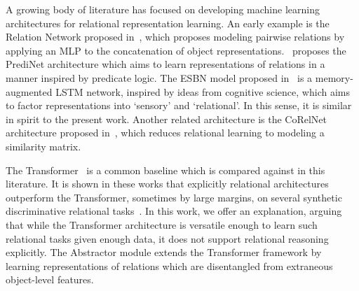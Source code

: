 
% 

A growing body of literature has focused on developing machine learning architectures for relational representation learning. An early example is the Relation Network proposed in~\citep{santoro1}, which proposes modeling pairwise relations by applying an MLP to the concatenation of object representations.~\citep{shanahanExplicitlyRelationalNeural} proposes the PrediNet architecture which aims to learn representations of relations in a manner inspired by predicate logic. The ESBN model proposed in~\citep{esbn} is a memory-augmented LSTM network, inspired by ideas from cognitive science, which aims to factor representations into `sensory' and `relational'. In this sense, it is similar in spirit to the present work. Another related architecture is the CoRelNet architecture proposed in~\citep{kerg2022neural}, which reduces relational learning to modeling a similarity matrix.

The Transformer~\citep{vaswani2017attention} is a common baseline which is compared against in this literature. It is shown in these works that explicitly relational architectures outperform the Transformer, sometimes by large margins, on several synthetic discriminative relational tasks~\citep{shanahanExplicitlyRelationalNeural,esbn,kerg2022neural}. In this work, we offer an explanation, arguing that while the Transformer architecture is versatile enough to learn such relational tasks given enough data, it does not support relational reasoning explicitly. The Abstractor module extends the Transformer framework by learning representations of relations which are disentangled from extraneous object-level features.

